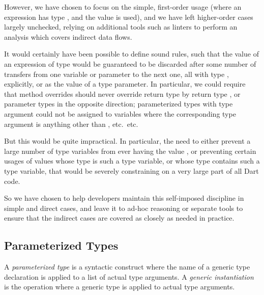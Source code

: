\documentclass[makeidx]{article}
\begin{document}
{{  However, we have chosen to focus on the simple, first-order usage
  (where an expression has type \VOID, and the value is used),
  and we have left higher-order cases largely unchecked,
  relying on additional tools such as linters to perform an analysis
  which covers indirect data flows.

  It would certainly have been possible to define sound rules,
  such that the value of an expression of type \VOID{}
  would be guaranteed to be discarded after some number of transfers
  from one variable or parameter to the next one, all with type \VOID,
  explicitly, or as the value of a type parameter.
  In particular, we could require that method overrides should
  never override return type  by return type \VOID,
  or parameter types in the opposite direction;
  parameterized types with type argument \VOID{} could not be assigned
  to variables where the corresponding type argument is anything other than
  \VOID, etc.\ etc.

  But this would be quite impractical.
  In particular, the need to either prevent a large number of type variables
  from ever having the value \VOID,
  or preventing certain usages of values whose type is such a type variable,
  or whose type contains such a type variable,
  that would be severely constraining on a very large part of all Dart code.

  So we have chosen to help developers maintain this self-imposed discipline
  in simple and direct cases,
  and leave it to ad-hoc reasoning or separate tools to ensure
  that the indirect cases are covered as closely as needed in practice.%
}


\subsection{Parameterized Types}


\LMHash{}%
A \emph{parameterized type} is a syntactic construct
where the name of a generic type declaration is applied to
a list of actual type arguments.
A \emph{generic instantiation} is the operation where
a generic type is applied to actual type arguments.

}
\end{document}
